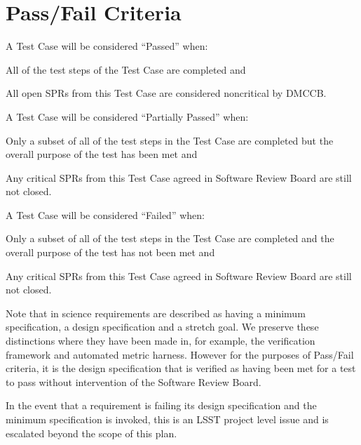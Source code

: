 
\section{Pass/Fail Criteria}


A Test Case will be considered ``Passed'' when:
\begin{itemize_single}
\item All of the test steps of the Test Case are completed and
\item All open SPRs from this Test Case are considered noncritical by DMCCB.
\end{itemize_single}

A Test Case will be considered ``Partially Passed'' when:
\begin{itemize_single}
\item Only a subset of all of the test steps in the Test Case are completed but the overall purpose of the test has been met and
\item Any critical SPRs from this Test Case agreed in Software Review Board are still not closed.
\end{itemize_single}

A Test Case will be considered ``Failed'' when:
\begin{itemize_single}
\item Only a subset of all of the test steps in the Test Case are completed and the overall purpose of the test has not been met and
\item Any critical SPRs from this Test Case agreed in Software Review Board are still not closed.
\end{itemize_single}

Note that in  science requirements are described as having a minimum specification, a design specification and a stretch goal. We preserve these distinctions where they have been made in, for example, the verification framework and automated metric harness. However for the purposes of Pass/Fail criteria, it is the design specification that is verified as having been met for a test to pass without intervention of the Software Review Board.

In the event that a requirement is failing its design specification and the minimum specification is invoked, this is an LSST project level issue and is escalated beyond the scope of this plan.
